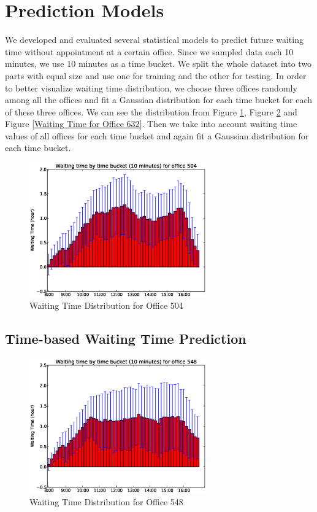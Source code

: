 \documentclass[10pt, conference, compsocconf]{IEEEtran}
\begin{document}
\section{Prediction Models}
We developed and evaluated several statistical models to predict future waiting time without appointment at a certain office.
Since we sampled data each 10 minutes, we use 10 minutes as a time bucket.
We split the whole
dataset into two parts with equal size and use one for training and the other for testing. 
 In order to better visualize waiting time distribution, we choose three offices randomly among
all the offices and fit a Gaussian distribution for each time bucket for each of these three offices. We can see the distribution from
Figure \ref{Waiting Time for Office 504}, Figure \ref{Waiting Time for Office 548} and Figure \ref{Waiting Time for Office 632}.
Then we take into account waiting time values of all offices for each time bucket 
and again fit a Gaussian distribution for each time bucket. 

\begin{figure}[!t]
\centering
\includegraphics[width=3in]{Office504.eps}
\caption{Waiting Time Distribution for Office 504}
\label{Waiting Time for Office 504}
\end{figure}
\subsection{Time-based Waiting Time Prediction}

\begin{figure}[!t]
\centering
\includegraphics[width=3in]{Office548.eps}
\caption{Waiting Time Distribution for Office 548}
\label{Waiting Time for Office 548}
\end{figure}
\end{document}
